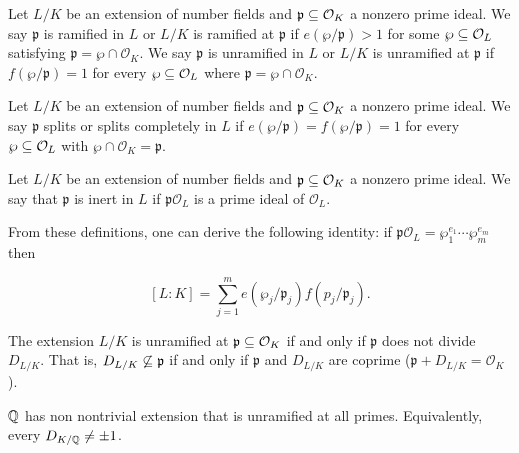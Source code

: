 \begin{definition}[Ramified]
    Let $L/K$ be an extension of number fields and $\mathfrak{p} \subseteq \mathcal{O}_{K}$ a nonzero prime ideal. We say $\mathfrak{p}$ is ramified in $L$ or $L/K$ is ramified at $\mathfrak{p}$ if $e(\wp /\mathfrak{p}) > 1$ for some $\wp  \subseteq \mathcal{O}_{L}$ satisfying $\mathfrak{p} = \wp \cap \mathcal{O}_{K}$. We say $\mathfrak{p}$ is unramified in $L$ or $L/K$ is unramified at $\mathfrak{p}$ if $f(\wp /\mathfrak{p}) =1$ for every $\wp  \subseteq \mathcal{O}_{L}$ where $\mathfrak{p} = \wp \cap \mathcal{O}_{K}$.
\end{definition}

\begin{definition}
    Let $L/K$ be an extension of number fields and $\mathfrak{p} \subseteq \mathcal{O}_{K}$ a nonzero prime ideal. We say $\mathfrak{p}$ splits or splits completely in $L$ if $e(\wp /\mathfrak{p}) = f(\wp /\mathfrak{p}) = 1$ for every $\wp  \subseteq \mathcal{O}_{L}$ with $\wp  \cap \mathcal{O}_{K} = \mathfrak{p}$.
\end{definition}

\begin{definition}[Inert]
    Let $L/K$ be an extension of number fields and $\mathfrak{p} \subseteq \mathcal{O}_{K}$ a nonzero prime ideal. We say that $\mathfrak{p}$ is inert in $L$ if $\mathfrak{p}\mathcal{O}_{L}$ is a prime ideal of $\mathcal{O}_{L}$.
\end{definition}

From these definitions, one can derive the following identity: if $\mathfrak{p} \mathcal{O}_{L} = \wp _1^{e_1}\cdots \wp _m^{e_m}$ then 

    \[[L:K] = \sum_{j=1}^m e(\wp _j/\mathfrak{p}_j)f(\mathit{p}_j/\mathfrak{p}_j).\]

\begin{theorem}
    The extension $L/K$ is unramified at $\mathfrak{p} \subseteq \mathcal{O}_{K}$ if and only if $\mathfrak{p}$ does not divide $D_{L/K}$.  That is, $D_{L/K} \not\subseteq \mathfrak{p}$ if and only if $\mathfrak{p}$ and $D_{L/K}$ are coprime ($\mathfrak{p} + D_{L/K} = \mathcal{O}_{K}$).
\end{theorem}

\begin{theorem}[Minkowski]
    $\mathbb{Q}$ has non nontrivial extension that is unramified at all primes. Equivalently, every $D_{K/\mathbb{Q}} \neq \pm 1$.
\end{theorem}

